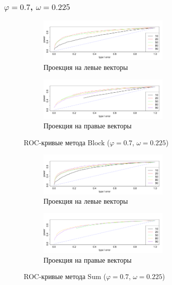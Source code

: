 \documentclass[specialist,
substylefile = spbu_report.rtx,
subf,href,colorlinks=true, 12pt]{disser}
\theoremstyle{definition}
\begin{document}
\subsubsection{$\varphi=0.7$, $\omega=0.225$}
\begin{figure}
	\captionsetup[subfigure]{justification=Centering}
	\begin{subfigure}[t]{\textwidth}
		\centering
		\includegraphics[width=0.7\textwidth]{img/roc_block_ev_omega0225.pdf}
		\caption{Проекция на левые векторы}
	\end{subfigure}\hspace{\fill}
	\begin{subfigure}[t]{\textwidth}
		\centering
		\includegraphics[width=0.7\textwidth]{img/roc_block_fa_omega0225.pdf}
		\caption{Проекция на правые векторы}
	\end{subfigure}
	\caption{ROC-кривые метода Block ($\varphi=0.7$, $\omega=0.225$)}
	\label{fig:block_omega0225}
\end{figure}
\begin{figure}[h!]
	\captionsetup[subfigure]{justification=Centering}
	\begin{subfigure}[t]{\textwidth}
		\centering
		\includegraphics[width=0.7\textwidth]{img/roc_sum_ev_omega0225.pdf}
		\caption{Проекция на левые векторы}
	\end{subfigure}
	\begin{subfigure}[t]{\textwidth}
		\centering
		\includegraphics[width=0.7\textwidth]{img/roc_sum_fa_omega0225.pdf}
		\caption{Проекция на правые векторы}
	\end{subfigure}
	\caption{ROC-кривые метода Sum ($\varphi=0.7$, $\omega=0.225$)}
	\label{fig:sum_omega0225}
\end{figure}
\end{document}
